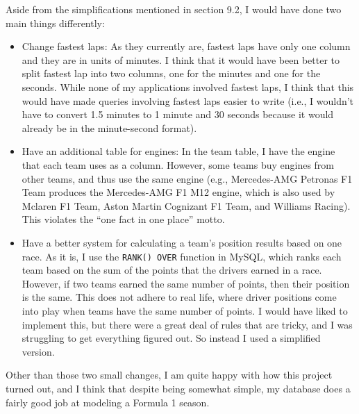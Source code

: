\documentclass{article} %
\begin{document}
Aside from the simplifications mentioned in section 9.2, I would have
done two main things differently:
\begin{itemize}
    \item Change fastest laps: As they currently are, fastest laps have
    only one column and they are in units of minutes. I think that it
    would have been better to split fastest lap into two columns, one
    for the minutes and one for the seconds. While none of my
    applications involved fastest laps, I think that this would have
    made queries involving fastest laps easier to write (i.e., I
    wouldn't have to convert 1.5 minutes to 1 minute and 30 seconds
    because it would already be in the minute-second format).

    \item Have an additional table for engines: In the team table, I
    have the engine that each team uses as a column. However, some teams
    buy engines from other teams, and thus use the same engine (e.g.,
    Mercedes-AMG Petronas F1 Team produces the Mercedes-AMG F1 M12
    engine, which is also used by Mclaren F1 Team, Aston Martin
    Cognizant F1 Team, and Williams Racing). This violates the ``one
    fact in one place'' motto.

    \item Have a better system for calculating a team's position results 
    based on one race. As it is, I use the \texttt{RANK() OVER} function
    in MySQL, which ranks each team based on the sum of the points that
    the drivers earned in a race. However, if two teams earned the same
    number of points, then their position is the same. This does not
    adhere to real life, where driver positions come into play when
    teams have the same number of points. I would have liked to
    implement this, but there were a great deal of rules that are
    tricky, and I was struggling to get everything figured out. So
    instead I used a simplified version.
\end{itemize}
Other than those two small changes, I am quite happy with how this
project turned out, and I think that despite being somewhat simple, my
database does a fairly good job at modeling a Formula 1 season.
\end{document}
